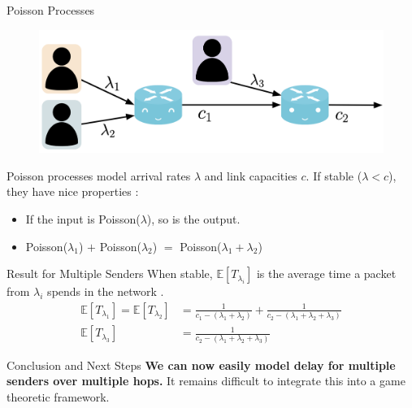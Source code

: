 \documentclass[final]{beamer}
\newlength{\colwidth}
\begin{document}
\begin{frame}[t]
\begin{columns}[t]
\begin{column}{\colwidth}
  \begin{block}{Poisson Processes}
    \vspace{-5mm}
    \begin{center}
      \begin{figure}
        \includegraphics[scale=.65]{images/poisson.png}
      \end{figure}
    \end{center}
    Poisson processes model arrival rates $\lambda$ and link capacities
     $c$. If stable ($\lambda < c$), they have nice properties \cite{morbook}:
     \begin{itemize}
      \item If the input is Poisson($\lambda$), so is the output.
      \item Poisson($\lambda_1$) $+$ Poisson($\lambda_2$) $=$ Poisson($\lambda_1 + \lambda_2$)
     \end{itemize}
  \end{block}
  \vspace{-6mm}

  \begin{block}{Result for Multiple Senders}
    \vspace{-7mm}
    When stable, $\mathbb{E}[T_{\lambda_i}]$ is the average time a packet from $\lambda_i$ spends in the network \cite{morbook}.
    \begin{align*}
      \mathbb{E}[T_{\lambda_1}] = \mathbb{E}[T_{\lambda_2}] &= \frac{1}{c_1 - (\lambda_1+\lambda_2)} + \frac{1}{c_2 - (\lambda_1 + \lambda_2+\lambda_3)}\\
      \mathbb{E}[T_{\lambda_3}] &= \frac{1}{c_2 - (\lambda_1 + \lambda_2+\lambda_3)}
    \end{align*}
  \end{block}
  \vspace{-6mm}

  \begin{block}{Conclusion and Next Steps}
    \vspace{-7mm}
    \textbf{We can now easily model delay for multiple senders over multiple hops.}
    It remains difficult to integrate this into a game theoretic framework.
    

\end{block}
\end{column}
\end{columns}
\end{frame}
\end{document}
